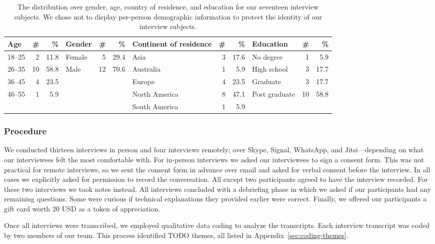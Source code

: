 \begin{table}[ht]
	\centering
	\begin{tabular}{l r r | l r r | l r r | l r r}
	\toprule
	Age & \# & \% &
	Gender & \# & \% &
	Continent of residence & \# & \% &
	Education & \# & \% \\
	\midrule
	18--25 & 2  & 11.8 & Female & 5  & 29.4 & Asia          & 3 & 17.6 & No degree     & 1  & 5.9 \\
	26--35 & 10 & 58.8 & Male   & 12 & 70.6 & Australia     & 1 &  5.9 & High school   & 3  & 17.7 \\
	36--45 & 4  & 23.5 &        &    &      & Europe        & 4 & 23.5 & Graduate      & 3  & 17.7 \\
	46--55 & 1  & 5.9  &        &    &      & North America & 8 & 47.1 & Post graduate & 10 & 58.8 \\
	       &    &      &        &    &      & South America & 1 &  5.9 & & & \\
	\bottomrule
	\end{tabular}
	\caption{The distribution over gender, age, country of residence, and
	education for our seventeen interview subjects.  We chose not to display
	per-person demographic information to protect the identity of our interview
	subjects.}
	\label{tab:interviewees}
\end{table}

\subsubsection{Procedure}

We conducted thirteen interviews in person and four interviews remotely; over
Skype, Signal, WhatsApp, and Jitsi---depending on what our interviewees felt
the most comfortable with.  For in-person interviews we asked our interviewees
to sign a consent form.  This was not practical for remote interviews, so we
sent the consent form in advance over email and asked for verbal consent before
the interview.  In all cases we explicitly asked for permission to record the
conversation.  All except two participants agreed to have the interview
recorded.  For these two interviews we took notes instead.  All interviews
concluded with a debriefing phase in which we asked if our participants had any
remaining questions.  Some were curious if technical explanations they provided
earlier were correct.  Finally, we offered our participants a gift card worth
20 USD as a token of appreciation.

Once all interviews were transcribed, we employed qualitative data coding to
analyze the transcripts.  Each interview transcript was coded by two members of
our team.  This process identified TODO themes, all listed in
Appendix~\ref{sec:coding-themes}.

